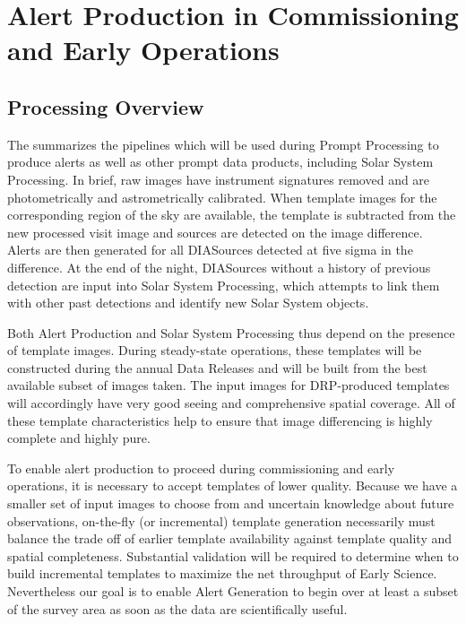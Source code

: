 \section{Alert Production in Commissioning and Early Operations}
\label{sec:pp}

\subsection{Processing Overview}

The \DPDD{} summarizes the pipelines which will be used during Prompt Processing to produce alerts as well as other prompt data products, including Solar System Processing.
In brief, raw images have instrument signatures removed and are photometrically and astrometrically calibrated.
When template images for the corresponding region of the sky are available, the template is subtracted from the new processed visit image and sources are detected on the image difference.
Alerts are then generated for all DIASources detected at five sigma in the difference.
At the end of the night, DIASources without a history of previous detection are input into Solar System Processing, which attempts to link them with other past detections and identify new Solar System objects.

Both Alert Production and Solar System Processing thus depend on the presence of template images.
During steady-state operations, these templates will be constructed during the annual Data Releases and will be built from the best available subset of images taken.
The input images for DRP-produced templates will accordingly have very good seeing and comprehensive spatial coverage.
All of these template characteristics help to ensure that image differencing is highly complete and highly pure.

To enable alert production to proceed during commissioning and early operations, it is necessary to accept templates of lower quality.
Because we have a smaller set of input images to choose from and uncertain knowledge about future observations, on-the-fly (or incremental) template generation necessarily must balance the trade off of earlier template availability against template quality and spatial completeness.
Substantial validation will be required to determine when to build incremental templates to maximize the net throughput of Early Science.
Nevertheless our goal is to enable Alert Generation to begin over at least a subset of the survey area as soon as the data are scientifically useful.

